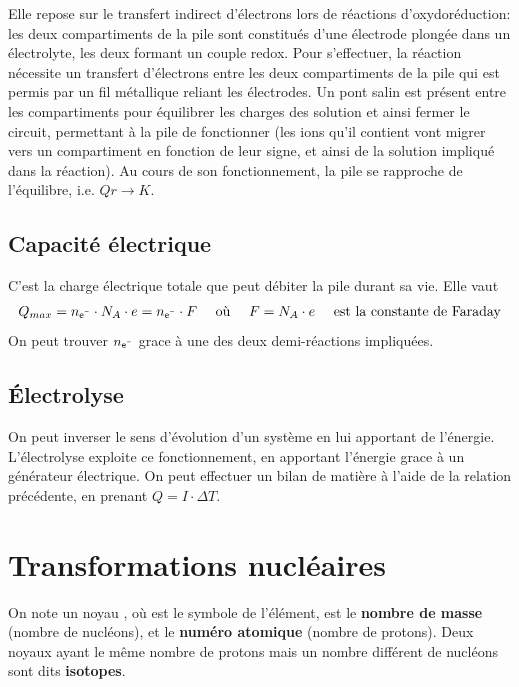 \documentclass[a5paper,10pt]{article}
\begin{document}
Elle repose sur le transfert indirect d'électrons lors de réactions d'oxydoréduction: les deux compartiments de la pile sont constitués d'une électrode plongée dans un électrolyte, les deux formant un couple redox. Pour s'effectuer, la réaction nécessite un transfert d'électrons entre les deux compartiments de la pile qui est permis par un fil métallique reliant les électrodes. Un pont salin est présent entre les compartiments pour équilibrer les charges des solution et ainsi fermer le circuit, permettant à la pile de fonctionner (les ions qu'il contient vont migrer vers un compartiment en fonction de leur signe, et ainsi  de la solution impliqué dans la réaction). Au cours de son fonctionnement, la pile se rapproche de l'équilibre, i.e. $Qr \to K$.

\vspace{0.4em}
\subsection{Capacité électrique}
C'est la charge électrique totale que peut débiter la pile durant sa vie. Elle vaut
\[
  Q_{max}=n_{\text{\ce{e^-}}}\cdot N_A \cdot e = n_{\text{\ce{e^-}}} \cdot F \quad\text{ où }\quad F=N_A\cdot e \quad\text{ est la constante de Faraday}
\]
On peut trouver $n_{\text{\ce{e^-}}}$ grace à une des deux demi-réactions impliquées.

\vspace{0.4em}
\subsection{Électrolyse}
On peut inverser le sens d'évolution d'un système en lui apportant de l'énergie. L'électrolyse exploite ce fonctionnement, en apportant l'énergie grace à un générateur électrique. On peut effectuer un bilan de matière à l'aide de la relation précédente, en prenant $Q=I\cdot\Delta T$.

\vspace{0.4em}
\section{Transformations nucléaires}
On note un noyau , où  est le symbole de l'élément,  est le \textbf{nombre de masse} (nombre de nucléons), et  le \textbf{numéro atomique} (nombre de protons). Deux noyaux ayant le même nombre de protons mais un nombre différent de nucléons sont dits \textbf{isotopes}.
\end{document}
